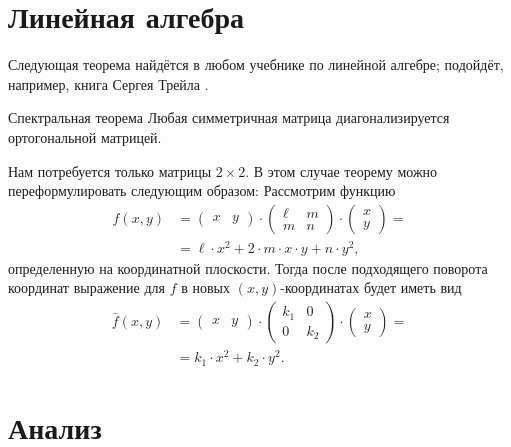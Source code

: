 {\section{Линейная алгебра}


Следующая теорема найдётся в любом учебнике по линейной алгебре;
подойдёт, например, книга Сергея Трейла \cite{treil}.

{\sloppy

\begin{thm}{Спектральная теорема}\label{thm:spectral}
Любая симметричная матрица диагонализируется ортогональной матрицей.
\end{thm}

}

Нам потребуется только матрицы $2{\times}2$.
В этом случае теорему можно переформулировать следующим образом:
Рассмотрим функцию
\begin{align*}
f(x,y)&=
\begin{pmatrix}
x&y
\end{pmatrix}
\cdot
\begin{pmatrix}
\ell&m
\\
m&n
\end{pmatrix}
\cdot
\begin{pmatrix}
x\\y
\end{pmatrix}=
\\
&=\ell\cdot x^2+2\cdot m\cdot x\cdot y+n\cdot y^2,
\end{align*}
определенную на координатной плоскости.
Тогда после подходящего поворота координат
выражение для $f$ в новых $(x,y)$-координатах будет иметь вид
\begin{align*}
\bar f(x,y)&=
\begin{pmatrix}
x&y
\end{pmatrix}
\cdot
\begin{pmatrix}
k_1&0
\\
0&k_2
\end{pmatrix}
\cdot
\begin{pmatrix}
x\\y
\end{pmatrix}=
\\
&=k_1\cdot x^2+k_2\cdot y^2.
\end{align*}


\spell{\end{multicols}}{}

\section{Анализ}\label{sec:analysis}

}
